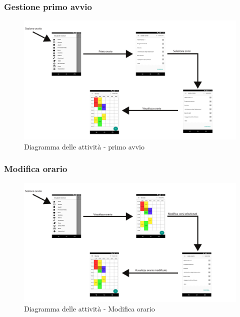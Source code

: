 \subsubsection{Gestione primo avvio}
\begin{figure}[H]
	\centering
	\includegraphics[width=\textwidth]{imgs/gruppo2/activity-orario-primo-avvio}
	\caption{Diagramma delle attività - primo avvio}
	\label{fig:act-diag-orario-primo-avvio}
\end{figure}

\subsubsection{Modifica orario}
\begin{figure}[H]
	\centering
	\includegraphics[width=\textwidth]{imgs/gruppo2/activity-orario-modifica-orario}
	\caption{Diagramma delle attività - Modifica orario}
	\label{fig:act-diag-orario-modifica-orario}
\end{figure}

